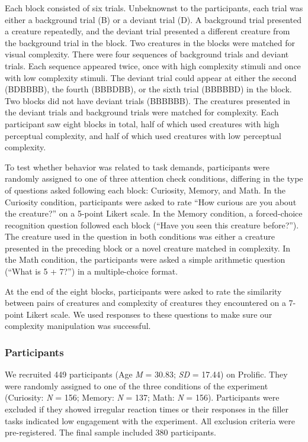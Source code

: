 \documentclass[10pt, letterpaper]{article}
\begin{document}
Each block consisted of six trials. Unbeknownst to the participants,
each trial was either a background trial (B) or a deviant trial (D). A
background trial presented a creature repeatedly, and the deviant trial
presented a different creature from the background trial in the block.
Two creatures in the blocks were matched for visual complexity. There
were four sequences of background trials and deviant trials. Each
sequence appeared twice, once with high complexity stimuli and once with
low complexity stimuli. The deviant trial could appear at either the
second (BDBBBB), the fourth (BBBDBB), or the sixth trial (BBBBBD) in the
block. Two blocks did not have deviant trials (BBBBBB). The creatures
presented in the deviant trials and background trials were matched for
complexity. Each participant saw eight blocks in total, half of which
used creatures with high perceptual complexity, and half of which used
creatures with low perceptual complexity.

To test whether behavior was related to task demands, participants were
randomly assigned to one of three attention check conditions, differing
in the type of questions asked following each block: Curiosity, Memory,
and Math. In the Curiosity condition, participants were asked to rate
``How curious are you about the creature?'' on a 5-point Likert scale.
In the Memory condition, a forced-choice recognition question followed
each block (``Have you seen this creature before?''). The creature used
in the question in both conditions was either a creature presented in
the preceding block or a novel creature matched in complexity. In the
Math condition, the participants were asked a simple arithmetic question
(``What is 5 + 7?'') in a multiple-choice format.

At the end of the eight blocks, participants were asked to rate the
similarity between pairs of creatures and complexity of creatures they
encountered on a 7-point Likert scale. We used responses to these
questions to make sure our complexity manipulation was successful.

\hypertarget{participants}{%
\subsubsection{Participants}\label{participants}}

We recruited 449 participants (Age \emph{M} = 30.83; \emph{SD} = 17.44)
on Prolific. They were randomly assigned to one of the three conditions
of the experiment (Curiosity: \emph{N} = 156; Memory: \emph{N} = 137;
Math: \emph{N} = 156). Participants were excluded if they showed
irregular reaction times or their responses in the filler tasks
indicated low engagement with the experiment. All exclusion criteria
were pre-registered. The final sample included 380 participants.
\end{document}
